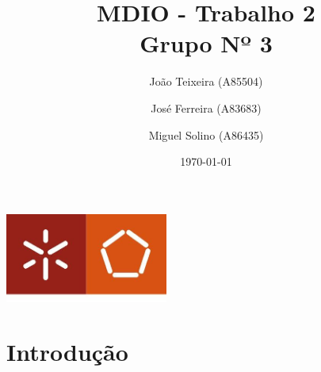 \documentclass[a4paper]{report}
\begin{document}
\title{MDIO - Trabalho 2\\ 
\large Grupo Nº 3}
\author{João Teixeira (A85504) \and José Ferreira (A83683) \and Miguel Solino (A86435)}
\date{\today}

\begin{center}
    \begin{minipage}{0.75\linewidth}
        \centering
        \includegraphics[width=0.4\textwidth]{images/eng.jpeg}\par\vspace{1cm}
        \vspace{1.5cm}
        \href{https://www.uminho.pt/PT}
        {\color{black}{\scshape\LARGE Universidade do Minho}} \par
        \vspace{1cm}
        \href{https://www.di.uminho.pt/}
        {\color{black}{\scshape\Large Departamento de Informática}} \par
        \vspace{1.5cm}
        \maketitle
    \end{minipage}
\end{center}

\tableofcontents

\pagebreak

\chapter{Introdução}
\end{document}
